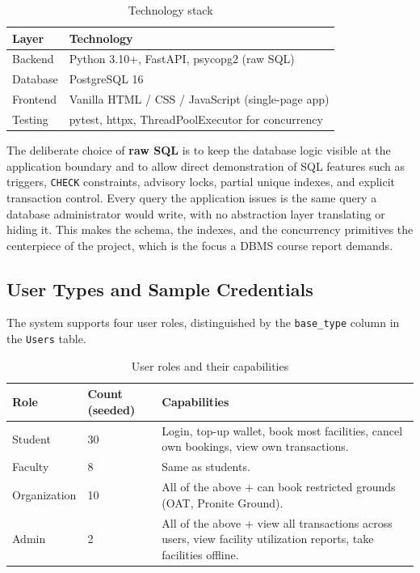 \documentclass[11pt,a4paper]{article}
\begin{document}
\begin{table}[H]
\centering
\begin{tabularx}{0.8\textwidth}{lX}
\toprule
\textbf{Layer} & \textbf{Technology} \\
\midrule
Backend         & Python 3.10+, FastAPI, psycopg2 (raw SQL) \\
Database        & PostgreSQL 16 \\
Frontend        & Vanilla HTML / CSS / JavaScript (single-page app) \\
Testing         & pytest, httpx, ThreadPoolExecutor for concurrency \\
\bottomrule
\end{tabularx}
\caption{Technology stack}
\end{table}

The deliberate choice of \textbf{raw SQL} is to keep the database logic visible at the application boundary and to allow direct demonstration of SQL features such as triggers, \texttt{CHECK} constraints, advisory locks, partial unique indexes, and explicit transaction control. Every query the application issues is the same query a database administrator would write, with no abstraction layer translating or hiding it. This makes the schema, the indexes, and the concurrency primitives the centerpiece of the project, which is the focus a DBMS course report demands.

\subsection{User Types and Sample Credentials}

The system supports four user roles, distinguished by the \texttt{base\_type} column in the \texttt{Users} table.

\begin{table}[H]
\centering
\begin{tabularx}{\textwidth}{llX}
\toprule
\textbf{Role} & \textbf{Count (seeded)} & \textbf{Capabilities} \\
\midrule
Student        & 30 & Login, top-up wallet, book most facilities, cancel own bookings, view own transactions. \\
Faculty        & 8  & Same as students. \\
Organization   & 10 & All of the above + can book restricted grounds (OAT, Pronite Ground). \\
Admin          & 2  & All of the above + view all transactions across users, view facility utilization reports, take facilities offline. \\
\bottomrule
\end{tabularx}
\caption{User roles and their capabilities}
\end{table}
\end{document}
